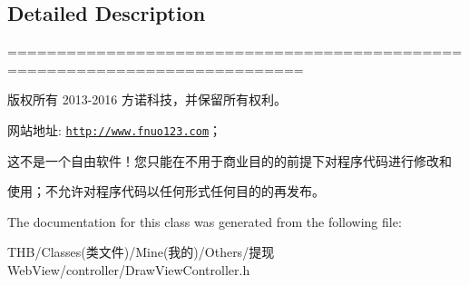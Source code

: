 \subsection{Detailed Description}
============================================================================

版权所有 2013-\/2016 方诺科技，并保留所有权利。

网站地址\+: \href{http://www.fnuo123.com}{\tt http\+://www.\+fnuo123.\+com}； 



这不是一个自由软件！您只能在不用于商业目的的前提下对程序代码进行修改和

使用；不允许对程序代码以任何形式任何目的的再发布。 

 

The documentation for this class was generated from the following file\+:\begin{DoxyCompactItemize}
\item 
T\+H\+B/\+Classes(类文件)/\+Mine(我的)/\+Others/提现\+Web\+View/controller/Draw\+View\+Controller.\+h\end{DoxyCompactItemize}
